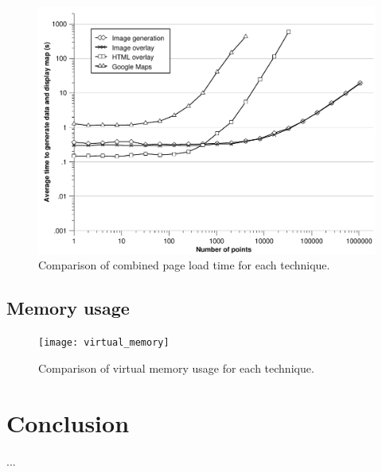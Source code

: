 \documentclass[acmtocl,acmnow]{acmtrans2m}
\begin{document}
\begin{figure}
	\begin{center}
		\includegraphics[scale=0.66]{combined_time}
	\end{center}
	\caption{Comparison of combined page load time for each technique.}
	\label{fig-combined-time}
\end{figure}


\subsection{Memory usage}


\begin{figure}
	\begin{center}
		\texttt{[image: virtual\_memory]}
	\end{center}
	\caption{Comparison of virtual memory usage for each technique.}
	\label{fig-virtual-memory}
\end{figure}


\section{Conclusion}








\begin{received}
...
\end{received}
\end{document}

